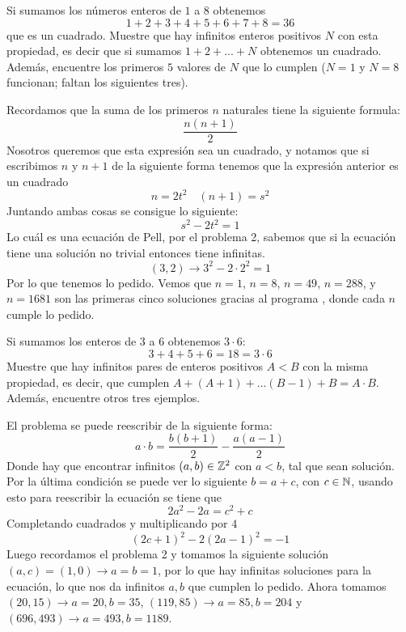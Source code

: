 \begin{prob}[3 pts.]
	Si sumamos los números enteros de $1$ a $8$ obtenemos
	\[1+2+3+4+5+6+7+8=36\]
	que es un cuadrado. Muestre que hay infinitos enteros positivos $N$ con esta propiedad, es decir que si sumamos $1+2+...+N$ obtenemos un cuadrado. Además, encuentre los primeros $5$ valores de $N$ que lo cumplen ($N=1$ y $N=8$ funcionan; faltan los siguientes tres).
\end{prob}

\begin{sol}
	Recordamos que la suma de los primeros $n$ naturales tiene la siguiente formula:
	\[
		\frac{n(n+1)}2
	\]
	Nosotros queremos que esta expresión sea un cuadrado, y notamos que si escribimos $n$ y $n+1$ de la siguiente forma tenemos que la expresión anterior es un cuadrado
	\[
		n=2t^2\quad(n+1)=s^2
	\]
	Juntando ambas cosas se consigue lo siguiente:
	\[
		s^2-2t^2=1
	\]
	Lo cuál es una ecuación de Pell, por el problema 2, sabemos que si la ecuación tiene una solución no trivial entonces tiene infinitas.
	\[
		(3,2)\rightarrow 3^2-2\cdot2^2=1
	\]
	Por lo que tenemos lo pedido. Vemos que $n=1$, $n=8$, $n=49$, $n=288$, y $n=1681$ son las primeras cinco soluciones gracias al programa \citep{prog}, donde cada $n$ cumple lo pedido.
\end{sol}

\begin{prob}[3 pts]
	Si sumamos los enteros de $3$ a $6$ obtenemos $3\cdot 6$:
	\[3+4+5+6=18=3\cdot 6\]
	Muestre que hay infinitos pares de enteros positivos $A<B$ con la misma propiedad, es decir, que cumplen $A+(A+1)+...(B-1)+B=A\cdot B$. Además, encuentre otros tres ejemplos.
\end{prob}

\begin{sol}
	El problema se puede reescribir de la siguiente forma:
	\[
		a\cdot b=\frac{b(b+1)}2-\frac{a(a-1)}2
	\]
	Donde hay que encontrar infinitos $(a,b)\in\mathbb{Z}^2$ con $a<b$, tal que sean solución. Por la última condición se puede ver lo siguiente $b=a+c$, con $c\in\mathbb{N}$, usando esto para reescribir la ecuación se tiene que
	\[
		2a^2-2a=c^2+c
	\]
	Completando cuadrados y multiplicando por $4$
	\[
		(2c+1)^2-2(2a-1)^2=-1
	\]
	Luego recordamos el problema 2 y tomamos la siguiente solución $(a,c)=(1,0)\rightarrow a=b=1$, por lo que hay infinitas soluciones para la ecuación, lo que nos da infinitos $a,b$ que cumplen lo pedido. Ahora tomamos $(20,15)\rightarrow a=20, b=35$, $(119,85)\rightarrow a=85, b=204$ y $(696,493)\rightarrow a=493, b=1189$.
\end{sol}




